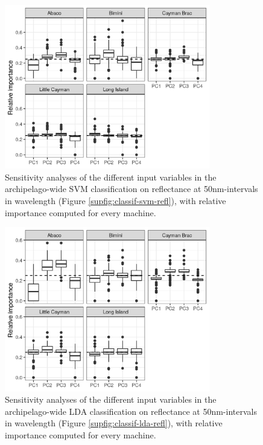 \begin{figure}[H]
	\centering
	\includegraphics[width=0.8\textwidth]{suppfigures/importance_svm_pca.png}
	\caption{Sensitivity analyses of the different input variables in the archipelago-wide SVM classification on reflectance at 50nm-intervals in wavelength (Figure \ref{supfig:classif-svm-refl}), with relative importance computed for every machine.}
	\label{supfig:importance-svm-refl}
\end{figure}

\begin{figure}[H]
	\centering
	\includegraphics[width=0.8\textwidth]{suppfigures/importance_lda_pca.png}
	\caption{Sensitivity analyses of the different input variables in the archipelago-wide LDA classification on reflectance at 50nm-intervals in wavelength (Figure \ref{supfig:classif-lda-refl}), with relative importance computed for every machine.}
	\label{supfig:importance-lda-refl}
\end{figure}

